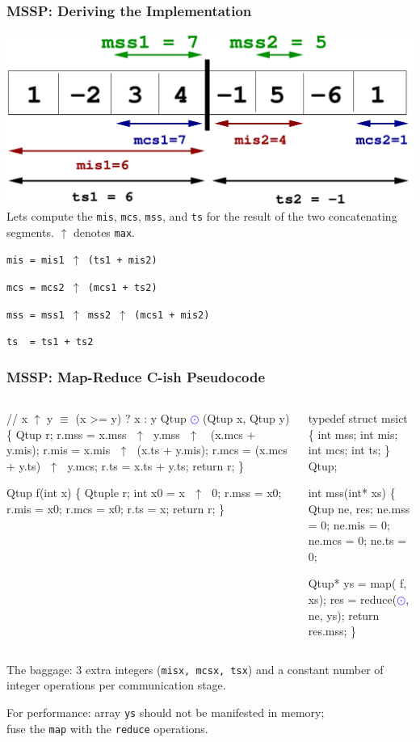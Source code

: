 \documentclass{beamer}
\newcommand{\blue}[1]{\textcolor{Blue}{{#1}}}
\renewcommand{\emph}[1]{\textcolor{CosGreen}{ #1}}
\newcommand{\emp}[1]{\textcolor{DikuRed}{ #1}}
\newcommand{\mymath}[1]{$ #1 $}
\begin{document}
\begin{frame}[fragile,t]
  \frametitle{MSSP: Deriving the Implementation}

\includegraphics[height=22ex]{img/day3/mssp2}
\medskip
Lets compute the {\tt mis}, {\tt mcs}, {\tt mss}, and {\tt ts} for
the result of the two concatenating segments. $\uparrow$ denotes {\tt max}.

\bigskip
{\tt mis = \pause mis1 $\uparrow$ (ts1 + mis2)}
\medskip

{\tt mcs = \pause mcs2 $\uparrow$ (mcs1 + ts2)}
\medskip

{\tt mss = \pause mss1 $\uparrow$ mss2 $\uparrow$ (mcs1 + mis2)}
\medskip

{\tt ts~~= ts1 + ts2}
\end{frame}


\begin{frame}[fragile,t]
  \frametitle{MSSP: Map-Reduce C-ish Pseudocode}

\begin{columns}
\begin{colorcode}
// x \mymath{\uparrow} y \mymath{\equiv} (x >= y) ? x : y
Qtup \blue{\mymath{\odot}} (Qtup x, Qtup y) \{
    Qtup r;
    r.mss = x.mss\mymath{\mbox{ }\uparrow\mbox{ }}y.mss\mymath{\mbox{ }\uparrow\mbox{ }}
            (x.mcs + y.mis);
    r.mis = x.mis\mymath{\mbox{ }\uparrow\mbox{ }}(x.ts + y.mis);
    r.mcs = (x.mcs + y.ts)\mymath{\mbox{ }\uparrow\mbox{ }}y.mcs;
    r.ts  = x.ts + y.ts;
    return r;
\}

Qtup \emp{f}(int x) \{
    Qtuple r;
    int x0 = x\mymath{\mbox{ }\uparrow\mbox{ }}0;
    r.mss = x0; r.mis = x0;
    r.mcs = x0; r.ts = x;
    return r;
\}
\end{colorcode}
\begin{colorcode}
typedef struct msict \{
  int mss;
  int mis;
  int mcs;
  int ts;
\} Qtup;

int mss(int* xs) \{
    Qtup ne, res; 
    ne.mss = 0; ne.mis = 0;
    ne.mcs = 0; ne.ts  = 0;
    
    Qtup* ys = \emph{map}(\emp{f}, xs);
    res = \emph{reduce}(\blue{\mymath{\odot}}, ne, ys);
    return res.mss;
\}
\end{colorcode}
\end{columns}
\smallskip

The baggage: $3$ extra integers ({\tt misx, mcsx, tsx}) 
and a constant number of integer operations per communication stage. 
\medskip

\emp{For performance:} array {\tt ys} should not be manifested in memory;\\
fuse the {\tt map} with the {\tt reduce} operations.

\end{frame}
\end{document}
